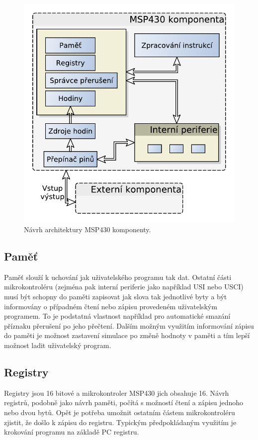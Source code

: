 \begin{figure}[ht]
\centering
\includegraphics[trim=0cm 0cm 0cm 0cm, scale=0.7]{fig/msp430_arch}
\caption{Návrh architektury MSP430 komponenty.}
\label{fig:msp430_arch}
\end{figure}

\subsection{Paměť}

Paměť slouží k uchování jak uživatelského programu tak dat. Ostatní části mikrokontroléru (zejména pak interní periferie jako například USI nebo USCI) musí být schopny do paměti zapisovat jak slova tak jednotlivé byty a být informovány o případném čtení nebo zápisu provedeném uživatelským programem. To je podstatná vlastnost například pro automatické smazání příznaku přerušení po jeho přečtení. Dalším možným využitím informování zápisu do paměti je možnost zastavení simulace po změně hodnoty v paměti a tím lepší možnost ladit uživatelský program.

\subsection{Registry}

Registry jsou 16 bitové a mikrokontroler MSP430 jich obsahuje 16. Návrh registrů, podobně jako návrh paměti, počítá s možností čtení a zápisu jednoho nebo dvou bytů. Opět je potřeba umožnit ostatním částem mikrokontroléru zjistit, že došlo k zápisu do registru. Typickým předpokládaným využitím je krokování
programu na základě PC registru.

